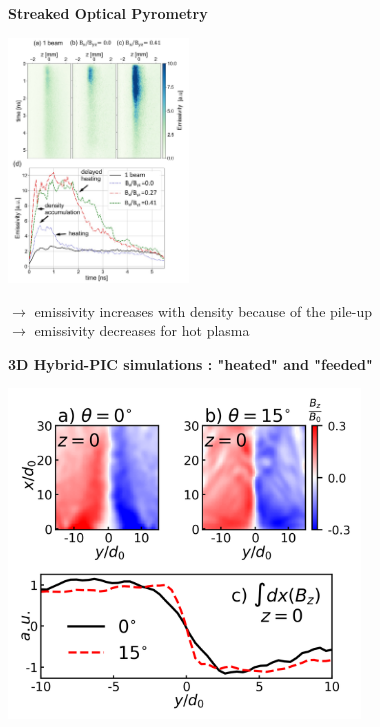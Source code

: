 \documentclass[landscape]{slides}
\begin{document}
\begin{slide}
\large{\textbf{Streaked Optical Pyrometry}}

\begin{center}
\includegraphics[width=0.36\textwidth]{fig2_vSOP_v5}
\end{center}

$\rightarrow$ emissivity increases with density because of the pile-up\\
$\rightarrow$ emissivity decreases for hot plasma

\end{slide}


\begin{slide}
\large{\textbf{3D Hybrid-PIC simulations : "heated" and "feeded"}}


\begin{center}
\includegraphics[width=0.7\textwidth]{fig4}
\end{center}


\end{slide}
\end{document}
